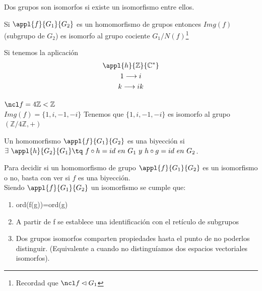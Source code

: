 \documentclass{apuntes}
\begin{document}
\begin{defn}
Dos grupos son isomorfos si existe un isomorfismo entre ellos.
\end{defn}

\begin{theorem}
Si $\appl{f}{G_1}{G_2}$ es un homomorfismo de grupos entonces $Img(f)$ (subgrupo de $G_2$) es isomorfo al grupo cociente $G_1/{N(f)}$\footnote{Recordad que $\ncl f \lhd G_1$}
\end{theorem}

\begin{example}
Si tenemos la aplicación 
\begin{gather*}
\appl{h}{\mathbb{Z}}{\mathbb{C}^*}\\
1 \longrightarrow i\\
k\longrightarrow ik\\
\end{gather*}

$\ncl f = 4\mathbb{Z} < \mathbb{Z}$\\
$Img(f) = \{1, i, -1, -i \}$
Tenemos que $\{ 1, i, -1, -i \}$ es isomorfo al grupo $(\mathbb{Z} /4\mathbb{Z}, +)$
\end{example}

\begin{defn}[Biyección]
 Un homomorfismo $\appl{f}{G_1}{G_2}$ es una biyección si \\
 $\exists \ \appl{h}{G_2}{G_1} \tq \ f\circ h =id \ en \ G_1 \ y\ h \circ g = id \ en \ G_2$.
\end{defn}
Para decidir si un homomorfismo de grupo $\appl{f}{G_1}{G_2}$  es un isomorfismo o no, basta con ver si $f$  es una biyección.\\

Siendo $\appl{f}{G_1}{G_2}$ un isomorfismo se cumple que:\\
\begin{enumerate}
 \item ord(f(g))=ord(g)
 \item A partir de f se establece una identificación con el retículo de subgrupos
 \item Dos grupos isomorfos comparten propiedades hasta el punto de no poderlos distinguir. (Equivalente a cuando no distinguíamos
 dos espacios vectoriales isomorfos).
\end{enumerate}
\end{document}
